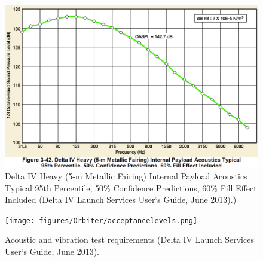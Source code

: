 \begin{figure}[h!]
\centering
\includegraphics[scale=0.3]{figures/Orbiter/acoustics.png}
\caption{Delta IV Heavy (5-m Metallic Fairing) Internal Payload Acoustics Typical 95th Percentile, 50\% Confidence Predictions, 60\% Fill Effect Included (Delta IV Launch Services User‘s Guide, June 2013).) \cite{Atlasm}}
\end{figure}

\begin{figure}[h!]
\centering
\texttt{[image: figures/Orbiter/acceptancelevels.png]}
\caption{Acoustic and vibration test requirements (Delta IV Launch Services User‘s Guide, June 2013).\cite{Atlasm}}
\label{fig:testlevels}
\end{figure}


